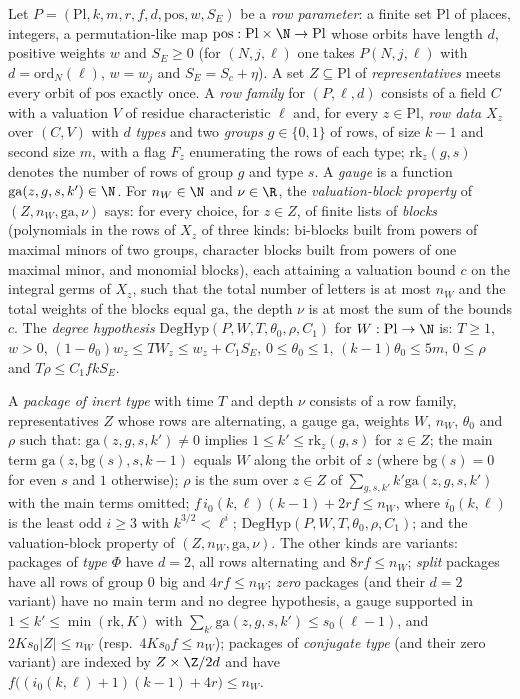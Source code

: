 \begin{definition}\label{pf:onto2:pkg}
Let $P=(\mathrm{Pl},k,m,r,f,d,\mathrm{pos},w,S_E)$ be a \emph{row parameter}: a finite set $\mathrm{Pl}$ of places, integers, a
permutation-like map $\mathrm{pos}:\mathrm{Pl}\times\N\to\mathrm{Pl}$ whose orbits have length $d$, positive weights $w$ and $S_E\ge0$
(for $(N,j,\ell)$ one takes $P(N,j,\ell)$ with $d=\mathrm{ord}_N(\ell)$, $w=w_j$ and $S_E=S_c+\eta$). A set $Z\subseteq\mathrm{Pl}$ of
\emph{representatives} meets every orbit of $\mathrm{pos}$ exactly once. A \emph{row family} for $(P,\ell,d)$ consists of a field $C$ with a valuation $V$ of residue characteristic $\ell$
and, for every $z\in\mathrm{Pl}$, \emph{row data} $X_z$ over $(C,V)$ with $d$ \emph{types} and two \emph{groups} $g\in\{0,1\}$ of rows,
of size $k-1$ and second size $m$, with a flag $F_z$ enumerating the rows of each type; $\mathrm{rk}_z(g,s)$ denotes the number of
rows of group $g$ and type $s$. A \emph{gauge} is a function $\mathrm{ga}(z,g,s,k')\in\N$. For $n_W\in\N$ and $\nu\in\R$, the
\emph{valuation-block property} of $(Z,n_W,\mathrm{ga},\nu)$ says: for every choice, for $z\in Z$, of finite lists of \emph{blocks}
(polynomials in the rows of $X_z$ of three kinds: bi-blocks built from powers of maximal minors of two groups, character blocks
built from powers of one maximal minor, and monomial blocks), each attaining a valuation bound $c$ on the integral germs of
$X_z$, such that the total number of letters is at most $n_W$ and the total weights of the blocks equal $\mathrm{ga}$, the depth
$\nu$ is at most the sum of the bounds $c$. The \emph{degree hypothesis} $\mathrm{DegHyp}(P,W,T,\theta_0,\rho,C_1)$
for $W:\mathrm{Pl}\to\N$ is: $T\ge1$, $w>0$,
$(1-\theta_0)w_z\le TW_z\le w_z+C_1S_E$, $0\le\theta_0\le1$, $(k-1)\theta_0\le5m$, $0\le\rho$ and $T\rho\le C_1fkS_E$.

A \emph{package of inert type} with time $T$ and depth $\nu$ consists of a
row family, representatives $Z$ whose rows are alternating, a gauge $\mathrm{ga}$, weights $W$, $n_W$, $\theta_0$ and $\rho$ such that:
$\mathrm{ga}(z,g,s,k')\ne0$ implies $1\le k'\le\mathrm{rk}_z(g,s)$ for $z\in Z$; the main term $\mathrm{ga}(z,\mathrm{bg}(s),s,k-1)$ equals
$W$ along the orbit of $z$ (where $\mathrm{bg}(s)=0$ for even $s$ and $1$ otherwise); $\rho$ is the sum over $z\in Z$ of
$\sum_{g,s,k'}k'\mathrm{ga}(z,g,s,k')$ with the main terms omitted; $f\,i_0(k,\ell)(k-1)+2rf\le n_W$, where $i_0(k,\ell)$ is the least
odd $i\ge3$ with $k^{3/2}<\ell^i$; $\mathrm{DegHyp}(P,W,T,\theta_0,\rho,C_1)$; and the valuation-block property of
$(Z,n_W,\mathrm{ga},\nu)$. The other kinds are variants:
packages of \emph{type $\Phi$} have $d=2$, all rows alternating and $8rf\le n_W$; \emph{split} packages have all rows of group $0$ big
and $4rf\le n_W$; \emph{zero} packages (and their $d=2$ variant) have no main term and no degree hypothesis, a gauge supported in
$1\le k'\le\min(\mathrm{rk},K)$ with $\sum_{k'}\mathrm{ga}(z,g,s,k')\le s_0(\ell-1)$, and $2Ks_0|Z|\le n_W$ (resp.\ $4Ks_0f\le n_W$);
packages of \emph{conjugate type} (and their zero variant) are indexed by $Z\times\Z/2d$ and have
$f\bigl((i_0(k,\ell)+1)(k-1)+4r\bigr)\le n_W$.


\end{definition}
